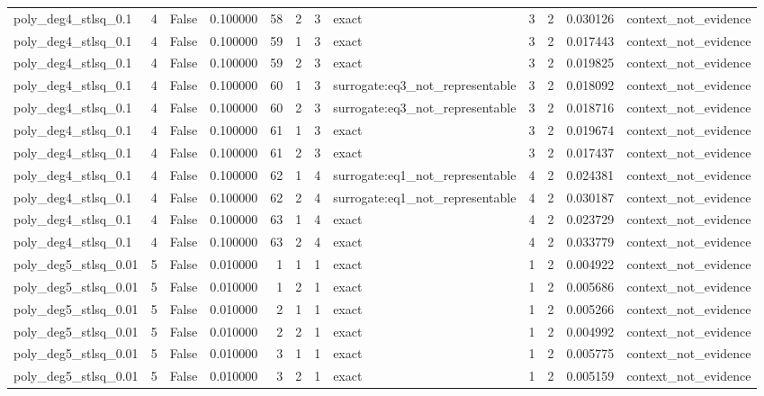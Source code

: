 \begin{tabular}{lrrrrrrlrrrl}
poly\_deg4\_stlsq\_0.1 & 4 & False & 0.100000 & 58 & 2 & 3 & exact & 3 & 2 & 0.030126 & context\_not\_evidence \\
poly\_deg4\_stlsq\_0.1 & 4 & False & 0.100000 & 59 & 1 & 3 & exact & 3 & 2 & 0.017443 & context\_not\_evidence \\
poly\_deg4\_stlsq\_0.1 & 4 & False & 0.100000 & 59 & 2 & 3 & exact & 3 & 2 & 0.019825 & context\_not\_evidence \\
poly\_deg4\_stlsq\_0.1 & 4 & False & 0.100000 & 60 & 1 & 3 & surrogate:eq3\_not\_representable & 3 & 2 & 0.018092 & context\_not\_evidence \\
poly\_deg4\_stlsq\_0.1 & 4 & False & 0.100000 & 60 & 2 & 3 & surrogate:eq3\_not\_representable & 3 & 2 & 0.018716 & context\_not\_evidence \\
poly\_deg4\_stlsq\_0.1 & 4 & False & 0.100000 & 61 & 1 & 3 & exact & 3 & 2 & 0.019674 & context\_not\_evidence \\
poly\_deg4\_stlsq\_0.1 & 4 & False & 0.100000 & 61 & 2 & 3 & exact & 3 & 2 & 0.017437 & context\_not\_evidence \\
poly\_deg4\_stlsq\_0.1 & 4 & False & 0.100000 & 62 & 1 & 4 & surrogate:eq1\_not\_representable & 4 & 2 & 0.024381 & context\_not\_evidence \\
poly\_deg4\_stlsq\_0.1 & 4 & False & 0.100000 & 62 & 2 & 4 & surrogate:eq1\_not\_representable & 4 & 2 & 0.030187 & context\_not\_evidence \\
poly\_deg4\_stlsq\_0.1 & 4 & False & 0.100000 & 63 & 1 & 4 & exact & 4 & 2 & 0.023729 & context\_not\_evidence \\
poly\_deg4\_stlsq\_0.1 & 4 & False & 0.100000 & 63 & 2 & 4 & exact & 4 & 2 & 0.033779 & context\_not\_evidence \\
poly\_deg5\_stlsq\_0.01 & 5 & False & 0.010000 & 1 & 1 & 1 & exact & 1 & 2 & 0.004922 & context\_not\_evidence \\
poly\_deg5\_stlsq\_0.01 & 5 & False & 0.010000 & 1 & 2 & 1 & exact & 1 & 2 & 0.005686 & context\_not\_evidence \\
poly\_deg5\_stlsq\_0.01 & 5 & False & 0.010000 & 2 & 1 & 1 & exact & 1 & 2 & 0.005266 & context\_not\_evidence \\
poly\_deg5\_stlsq\_0.01 & 5 & False & 0.010000 & 2 & 2 & 1 & exact & 1 & 2 & 0.004992 & context\_not\_evidence \\
poly\_deg5\_stlsq\_0.01 & 5 & False & 0.010000 & 3 & 1 & 1 & exact & 1 & 2 & 0.005775 & context\_not\_evidence \\
poly\_deg5\_stlsq\_0.01 & 5 & False & 0.010000 & 3 & 2 & 1 & exact & 1 & 2 & 0.005159 & context\_not\_evidence \\

\end{tabular}
